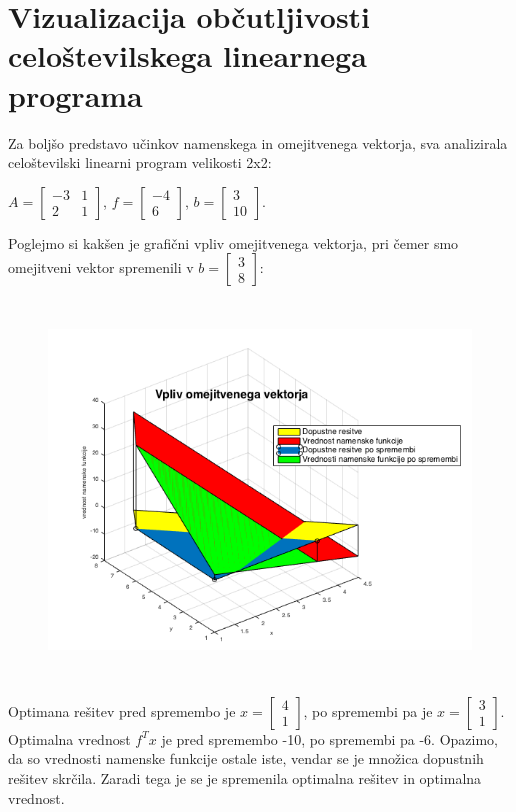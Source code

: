 \documentclass[a4paper,12pt]{article}
\begin{document}
\clearpage

\section{Vizualizacija občutljivosti celoštevilskega linearnega programa}

Za boljšo predstavo učinkov namenskega in omejitvenega vektorja, sva analizirala celoštevilski linearni program velikosti 2x2:
\begin{center}
$ A = \begin{bmatrix}
  -3 & 1  \\
  2 & 1   
\end{bmatrix} $, $f=\begin{bmatrix} -4 \\ 6\end{bmatrix}$, $b=\begin{bmatrix} 3 \\ 10 \end{bmatrix}.$
\\[0.5cm]
\end{center}

Poglejmo si kakšen je grafični vpliv omejitvenega vektorja, pri čemer smo omejitveni vektor spremenili v $b=\begin{bmatrix} 3 \\ 8\end{bmatrix}$:

\begin{figure}[h!]
\includegraphics[width=15cm,height=10cm]{viz1.png}
\centering
\end{figure}
Optimana rešitev pred spremembo je $x=\begin{bmatrix} 4 \\ 1 \end{bmatrix}$, po spremembi pa je $x=\begin{bmatrix} 3 \\ 1\end{bmatrix}$. Optimalna vrednost $f^Tx$ je pred spremembo -10, po spremembi pa -6. Opazimo, da so vrednosti namenske funkcije ostale iste, vendar se je množica dopustnih rešitev skrčila. Zaradi tega je se je spremenila optimalna rešitev in optimalna vrednost.
\end{document}
